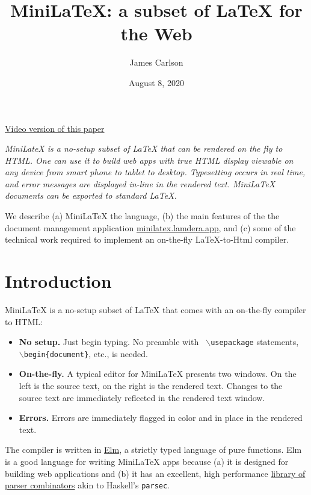 \documentclass[11pt, oneside]{article}
\newcommand{\code}[1]{{\tt #1}}
\newcommand{\italic}[1]{{\sl #1}}
\newcommand{\strong}[1]{{\bf #1}}
\newcommand{\bs}[1]{$\backslash$#1}
\newcommand{\texarg}[1]{\{#1\}}
\begin{document}
 \title{MiniLaTeX:  a  subset  of  LaTeX  for  the  Web}  \author{James  Carlson}  \date{August  8,  2020}
 \maketitle
\parskip0pt
\tableofcontents
\parskip5pt
 \href{https://youtu.be/TAIYpCc3VV0}{Video  version  of  this  paper}


\italic{MiniLateX  is  a  no-setup  subset  of  LaTeX  that  can  be  rendered  on  the  fly  to  HTML.    One  can  use  it  to  build  web  apps  with  true  HTML  display  viewable  on  any  device  from  smart  phone  to  tablet  to  desktop.   Typesetting  occurs  in  real  time,  and  error  messages  are  displayed  in-line  in  the  rendered  text.  MiniLaTeX  documents  can  be  exported  to  standard  LaTeX.

  \medskip We  describe  (a)  MiniLaTeX  the  language,  (b)  the  main  features  of  the  the  document  management  application
  \href{https://minilatex.lamdera.app}{minilatex.lamdera.app},  and  (c)  some  of  the  technical  work  required  to  implement  an  on-the-fly  LaTeX-to-Html  compiler.}




 \section{Introduction}
MiniLaTeX  is  a  no-setup  subset  of  LaTeX  that  comes  with  an  on-the-fly  compiler  to  HTML:


\begin{itemize}
\item  \strong{No  setup.} Just  begin  typing.   No  preamble  with   \code{ \bs{usepackage}} statements,   \code{ \bs{begin}\texarg{document}},  etc.,  is  needed.




 \item  \strong{On-the-fly.} A  typical  editor  for  MiniLaTeX  presents  two  windows.   On  the  left  is  the  source  text,  on  the  right  is  the  rendered  text.   Changes  to  the  source  text  are  immediately  reflected  in  the  rendered  text  window.



 \item  \strong{Errors.} Errors  are  immediately  flagged  in  color  and  in  place  in  the  rendered  text.
\end{itemize}

The  compiler  is  written  in   \href{https://elm-lang.org}{Elm},  a  strictly  typed  language  of  pure  functions.   Elm  is  a  good  language  for  writing  MiniLaTeX  apps  because  (a)  it  is  designed  for  building  web  applications  and  (b)  it  has  an  excellent,  high  performance    \href{https://package.elm-lang.org/packages/elm/parser/latest/}{library  of  parser  combinators} akin  to  Haskell's   \code{parsec}.
\end{document}
